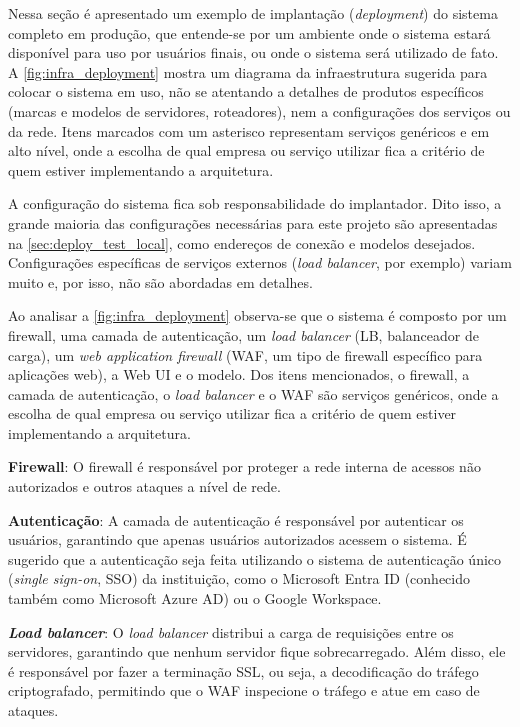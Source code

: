 \documentclass[journal]{IEEEtran}
\begin{document}
\noindent%
Nessa seção é apresentado um exemplo de implantação (\textit{deployment}) do sistema completo em produção, que entende-se por um ambiente onde o sistema estará disponível para uso por usuários finais, ou onde o sistema será utilizado de fato.
A \cref{fig:infra_deployment} mostra um diagrama da infraestrutura sugerida para colocar o sistema em uso, não se atentando a detalhes de produtos específicos (marcas e modelos de servidores, roteadores), nem a configurações dos serviços ou da rede.
Itens marcados com um asterisco representam serviços genéricos e em alto nível, onde a escolha de qual empresa ou serviço utilizar fica a critério de quem estiver implementando a arquitetura. 

A configuração do sistema fica sob responsabilidade do implantador.
Dito isso, a grande maioria das configurações necessárias para este projeto são apresentadas na \cref{sec:deploy_test_local}, como endereços de conexão e modelos desejados.
Configurações específicas de serviços externos (\textit{load balancer}, por exemplo) variam muito e, por isso, não são abordadas em detalhes.

Ao analisar a \cref{fig:infra_deployment} observa-se que o sistema é composto por um firewall, uma camada de autenticação, um \textit{load balancer} (LB, balanceador de carga), um \textit{web application firewall} (WAF, um tipo de firewall específico para aplicações web), a Web UI e o modelo.
Dos itens mencionados, o firewall, a camada de autenticação, o \textit{load balancer} e o WAF são serviços genéricos, onde a escolha de qual empresa ou serviço utilizar fica a critério de quem estiver implementando a arquitetura.

\noindent\textbf{Firewall}:
O firewall é responsável por proteger a rede interna de acessos não autorizados e outros ataques a nível de rede.

\noindent\textbf{Autenticação}:
A camada de autenticação é responsável por autenticar os usuários, garantindo que apenas usuários autorizados acessem o sistema.
É sugerido que a autenticação seja feita utilizando o sistema de autenticação único (\textit{single sign-on}, SSO) da instituição, como o Microsoft Entra ID (conhecido também como Microsoft Azure AD) ou o Google Workspace.

\noindent\textbf{\textit{Load balancer}}:
O \textit{load balancer} distribui a carga de requisições entre os servidores, garantindo que nenhum servidor fique sobrecarregado.
Além disso, ele é responsável por fazer a terminação SSL, ou seja, a decodificação do tráfego criptografado, permitindo que o WAF inspecione o tráfego e atue em caso de ataques.
\end{document}
